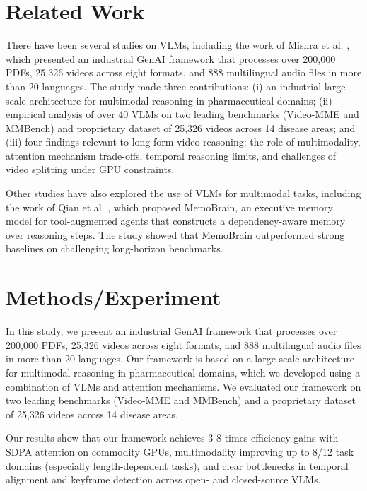 \documentclass{article}
\begin{document}
\section{Related Work}

There have been several studies on VLMs, including the work of Mishra et al. \cite{mishra2026scalingvisionlanguagemodels}, which presented an industrial GenAI framework that processes over 200,000 PDFs, 25,326 videos across eight formats, and 888 multilingual audio files in more than 20 languages. The study made three contributions: (i) an industrial large-scale architecture for multimodal reasoning in pharmaceutical domains; (ii) empirical analysis of over 40 VLMs on two leading benchmarks (Video-MME and MMBench) and proprietary dataset of 25,326 videos across 14 disease areas; and (iii) four findings relevant to long-form video reasoning: the role of multimodality, attention mechanism trade-offs, temporal reasoning limits, and challenges of video splitting under GPU constraints.

Other studies have also explored the use of VLMs for multimodal tasks, including the work of Qian et al. \cite{qian2026memobrainexecutivememoryagentic}, which proposed MemoBrain, an executive memory model for tool-augmented agents that constructs a dependency-aware memory over reasoning steps. The study showed that MemoBrain outperformed strong baselines on challenging long-horizon benchmarks.

\section{Methods/Experiment}

In this study, we present an industrial GenAI framework that processes over 200,000 PDFs, 25,326 videos across eight formats, and 888 multilingual audio files in more than 20 languages. Our framework is based on a large-scale architecture for multimodal reasoning in pharmaceutical domains, which we developed using a combination of VLMs and attention mechanisms. We evaluated our framework on two leading benchmarks (Video-MME and MMBench) and a proprietary dataset of 25,326 videos across 14 disease areas.

Our results show that our framework achieves 3-8 times efficiency gains with SDPA attention on commodity GPUs, multimodality improving up to 8/12 task domains (especially length-dependent tasks), and clear bottlenecks in temporal alignment and keyframe detection across open- and closed-source VLMs.
\end{document}

